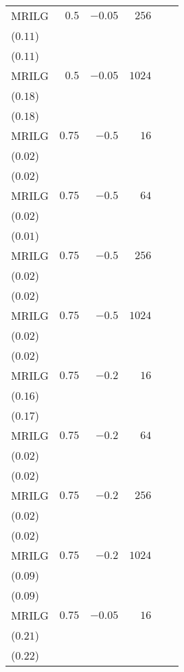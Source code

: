 \begin{table}[t]
\begin{tabular}{lrrrrr}
MRILG & \(0.5\) & \(-0.05\) & \(256\) & \longcell{\(0.28\)\\{\tiny(\(0.11\))}} & \longcell{\(0.29\)\\{\tiny(\(0.11\))}} \\[2.2ex]
MRILG & \(0.5\) & \(-0.05\) & \(1024\) & \longcell{\(0.19\)\\{\tiny(\(0.18\))}} & \longcell{\(0.19\)\\{\tiny(\(0.18\))}} \\[2.2ex]
MRILG & \(0.75\) & \(-0.5\) & \(16\) & \longcell{\(0.40\)\\{\tiny(\(0.02\))}} & \longcell{\(0.41\)\\{\tiny(\(0.02\))}} \\[2.2ex]
MRILG & \(0.75\) & \(-0.5\) & \(64\) & \longcell{\(0.35\)\\{\tiny(\(0.02\))}} & \longcell{\(0.36\)\\{\tiny(\(0.01\))}} \\[2.2ex]
MRILG & \(0.75\) & \(-0.5\) & \(256\) & \longcell{\(0.31\)\\{\tiny(\(0.02\))}} & \longcell{\(0.32\)\\{\tiny(\(0.02\))}} \\[2.2ex]
MRILG & \(0.75\) & \(-0.5\) & \(1024\) & \longcell{\(0.30\)\\{\tiny(\(0.02\))}} & \longcell{\(0.31\)\\{\tiny(\(0.02\))}} \\[2.2ex]
MRILG & \(0.75\) & \(-0.2\) & \(16\) & \longcell{\(0.32\)\\{\tiny(\(0.16\))}} & \longcell{\(0.32\)\\{\tiny(\(0.17\))}} \\[2.2ex]
MRILG & \(0.75\) & \(-0.2\) & \(64\) & \longcell{\(0.35\)\\{\tiny(\(0.02\))}} & \longcell{\(0.36\)\\{\tiny(\(0.02\))}} \\[2.2ex]
MRILG & \(0.75\) & \(-0.2\) & \(256\) & \longcell{\(0.33\)\\{\tiny(\(0.02\))}} & \longcell{\(0.34\)\\{\tiny(\(0.02\))}} \\[2.2ex]
MRILG & \(0.75\) & \(-0.2\) & \(1024\) & \longcell{\(0.26\)\\{\tiny(\(0.09\))}} & \longcell{\(0.26\)\\{\tiny(\(0.09\))}} \\[2.2ex]
MRILG & \(0.75\) & \(-0.05\) & \(16\) & \longcell{\(0.20\)\\{\tiny(\(0.21\))}} & \longcell{\(0.20\)\\{\tiny(\(0.22\))}} \\[2.2ex]

\end{tabular}
\end{table}
